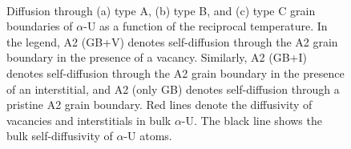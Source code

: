 \documentclass[review]{elsarticle}
\begin{document}
\begin{figure}[h!]
\centering
{}
\\
\caption{Diffusion through (a) type A, (b) type B, and (c) type C grain boundaries of $\alpha$-U as a function of the reciprocal temperature. In the legend, A2 (GB+V) denotes self-diffusion through the A2 grain boundary in the presence of a vacancy. Similarly, A2 (GB+I) denotes self-diffusion through the A2 grain boundary in the presence of an interstitial, and A2 (only GB) denotes self-diffusion through a pristine A2 grain boundary. Red lines denote the diffusivity of vacancies and interstitials in bulk $\alpha$-U. The black line shows the bulk self-diffusivity of $\alpha$-U atoms.}
\label{fig:Dif}
\end{figure}
\end{document}
